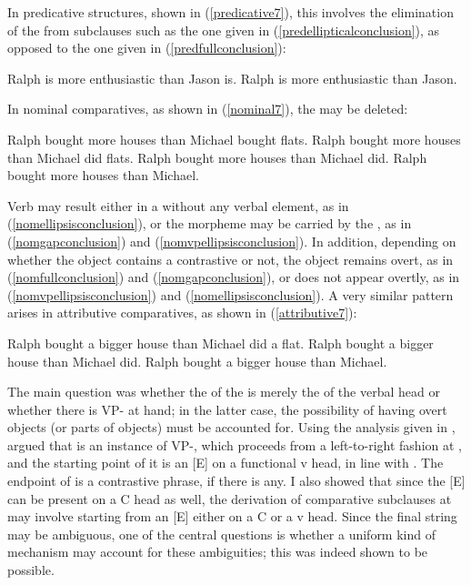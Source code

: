 In  predicative structures, shown in (\ref{predicative7}), this involves the elimination of the  from subclauses such as the one given in (\ref{predellipticalconclusion}), as opposed to the one given in (\ref{predfullconclusion}):

\ea \label{predicative7}
\ea	Ralph is more enthusiastic than Jason is. \label{predfullconclusion}
\ex	Ralph is more enthusiastic than Jason. \label{predellipticalconclusion}
\z
\z

In nominal comparatives, as shown in (\ref{nominal7}), the  may be deleted:

\ea \label{nominal7}
\ea	Ralph bought more houses than Michael bought flats. \label{nomfullconclusion}
\ex	Ralph bought more houses than Michael did flats. \label{nomgapconclusion}
\ex	Ralph bought more houses than Michael did. \label{nomvpellipsisconclusion}
\ex	Ralph bought more houses than Michael. \label{nomellipsisconclusion}
\z
\z

Verb  may result either in a  without any verbal element, as in (\ref{nomellipsisconclusion}), or the  morpheme may be carried by the , as in (\ref{nomgapconclusion}) and (\ref{nomvpellipsisconclusion}). In addition, depending on whether the object contains a contrastive  or not, the object  remains overt, as in (\ref{nomfullconclusion}) and (\ref{nomgapconclusion}), or does not appear overtly, as in (\ref{nomvpellipsisconclusion}) and (\ref{nomellipsisconclusion}). A very similar pattern arises in attributive comparatives, as shown in (\ref{attributive7}):

\ea \label{attributive7}
\ea	Ralph bought a bigger house than Michael did a flat.
\ex	Ralph bought a bigger house than Michael did.
\ex	Ralph bought a bigger house than Michael.	
\z
\z

The main question was whether the  of the  is merely the  of the verbal head or whether there is VP- at hand; in the latter case, the possibility of having overt objects (or parts of objects) must be accounted for. Using the analysis given in ,  argued that  is an instance of VP-, which proceeds from a left-to-right fashion at , and the starting point of it is an [E]  on a functional v head, in line with \citet{merchant2001}. The endpoint of  is a contrastive phrase, if there is any. I also showed that since the [E]  can be present on a C head as well, the derivation of comparative subclauses at  may involve  starting from an [E]  either on a C or a v head. Since the final string may be ambiguous, one of the central questions is whether a uniform kind of  mechanism may account for these ambiguities; this was indeed shown to be possible.

